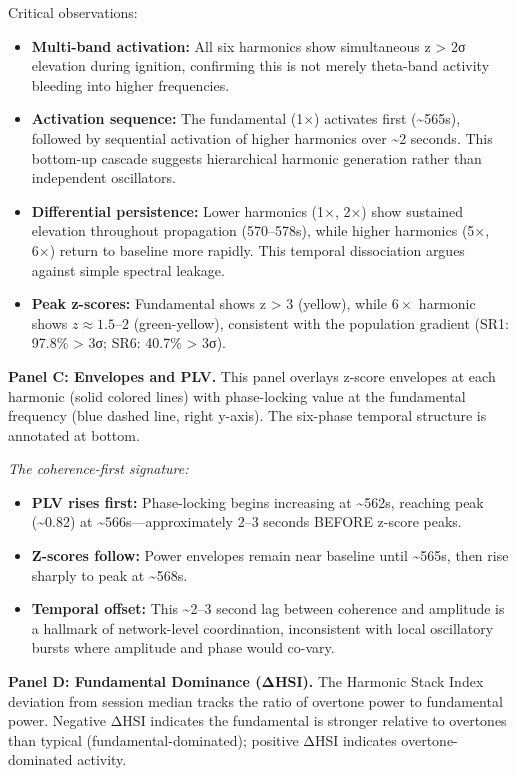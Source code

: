 \documentclass[11pt,a4paper]{article}
\begin{document}
Critical observations:
\begin{itemize}
\item \textbf{Multi-band activation:} All six harmonics show simultaneous z > 2σ elevation during ignition, confirming this is not merely theta-band activity bleeding into higher frequencies.
\item \textbf{Activation sequence:} The fundamental (1×) activates first (\textasciitilde{}565s), followed by sequential activation of higher harmonics over \textasciitilde{}2 seconds. This bottom-up cascade suggests hierarchical harmonic generation rather than independent oscillators.
\item \textbf{Differential persistence:} Lower harmonics (1×, 2×) show sustained elevation throughout propagation (570–578s), while higher harmonics (5×, 6×) return to baseline more rapidly. This temporal dissociation argues against simple spectral leakage.
\item \textbf{Peak z-scores:} Fundamental shows z > 3 (yellow), while $6\times$ harmonic shows $z \approx 1.5$--$2$ (green-yellow), consistent with the population gradient (SR1: 97.8\% > 3σ; SR6: 40.7\% > 3σ).
\end{itemize}

\textbf{Panel C: Envelopes and PLV.}
This panel overlays z-score envelopes at each harmonic (solid colored lines) with phase-locking value at the fundamental frequency (blue dashed line, right y-axis). The six-phase temporal structure is annotated at bottom.

\textit{The coherence-first signature:}
\begin{itemize}
\item \textbf{PLV rises first:} Phase-locking begins increasing at \textasciitilde{}562s, reaching peak (\textasciitilde{}0.82) at \textasciitilde{}566s—approximately 2–3 seconds BEFORE z-score peaks.
\item \textbf{Z-scores follow:} Power envelopes remain near baseline until \textasciitilde{}565s, then rise sharply to peak at \textasciitilde{}568s.
\item \textbf{Temporal offset:} This \textasciitilde{}2–3 second lag between coherence and amplitude is a hallmark of network-level coordination, inconsistent with local oscillatory bursts where amplitude and phase would co-vary.
\end{itemize}

\textbf{Panel D: Fundamental Dominance (ΔHSI).}
The Harmonic Stack Index deviation from session median tracks the ratio of overtone power to fundamental power. Negative ΔHSI indicates the fundamental is stronger relative to overtones than typical (fundamental-dominated); positive ΔHSI indicates overtone-dominated activity.
\end{document}
